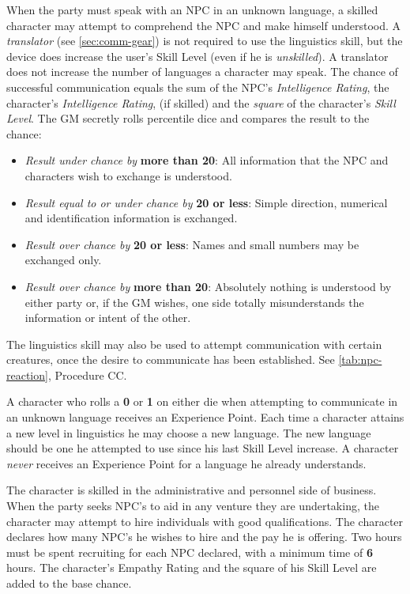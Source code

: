 When the party must speak with an NPC in an unknown language, a
skilled character may attempt to comprehend the NPC and make himself
understood.  A \emph{translator} (see \ref{sec:comm-gear}) is not required
to use the linguistics skill, but the device does increase the user's
Skill Level (even if he is \emph{unskilled}).  A translator does not
increase the number of languages a character may speak.  The chance of
successful communication equals the sum of the NPC's
\emph{Intelligence Rating}, the character's \emph{Intelligence
  Rating}, (if skilled) and the \emph{square} of the character's
\emph{Skill Level}.  The GM secretly rolls percentile dice and
compares the result to the chance:

\begin{itemize}
\item \emph{Result under chance by} \textbf{more than 20}: All
  information that the NPC and characters wish to exchange is
  understood.
\item \emph{Result equal to or under chance by}  \textbf{20 or less}:
  Simple  direction, numerical and identification information is
  exchanged.
\item \emph{Result over chance by} \textbf{20 or less}: Names and
  small numbers may be exchanged only.
\item \emph{Result over chance by} \textbf{more than 20}: Absolutely
  nothing is understood by either party or, if the GM wishes, one
  side totally misunderstands the information or intent of the other.
\end{itemize}

The linguistics skill may also be used to attempt communication with
certain creatures, once the desire to communicate has been
established.  See \ref{tab:npc-reaction}, Procedure CC.

A character who rolls a \textbf{0} or \textbf{1} on either die when
attempting to communicate in an unknown language receives an
Experience Point.  Each time a character attains a new level in
linguistics he may choose a new language.  The new language should be
one he attempted to use since his last Skill Level increase.  A
character \emph{never} receives an Experience Point for a language he
already understands.

\label{sec:skill-recruiting}

The character is skilled in the administrative and personnel side of
business.  When the party seeks NPC's to aid in any venture they are
undertaking, the character may attempt to hire individuals with good
qualifications.  The character declares how many NPC's he wishes to
hire and the pay he is offering.  Two hours must be spent recruiting
for each NPC declared, with a minimum time of \textbf{6} hours.  The
character's Empathy Rating and the square of his Skill Level are added
to the base chance.

